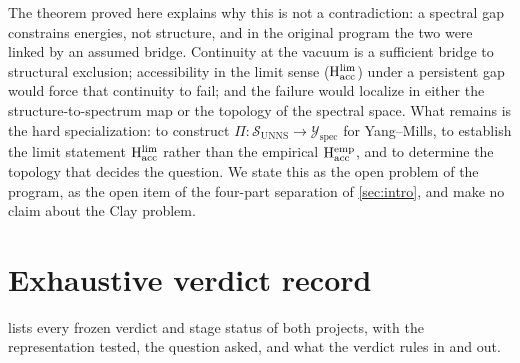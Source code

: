 \documentclass[11pt,a4paper]{article}
\theoremstyle{definition}
\theoremstyle{remark}
\newcommand{\SUNNS}{\mathcal{S}_{\mathrm{UNNS}}}
\newcommand{\Yspec}{\mathcal{Y}_{\mathrm{spec}}}
\newcommand{\Hacc}{\mathrm{H}_{\mathrm{acc}}}
\begin{document}
The theorem proved here explains why this is not a contradiction: a spectral gap constrains energies, not structure, and in the original program the two were linked by an assumed bridge. Continuity at the vacuum is a sufficient bridge to structural exclusion; accessibility in the limit sense ($\Hacc^{\rm lim}$) under a persistent gap would force that continuity to fail; and the failure would localize in either the structure-to-spectrum map or the topology of the spectral space. What remains is the hard specialization: to construct $\Pi:\SUNNS\to\Yspec$ for Yang--Mills, to establish the limit statement $\Hacc^{\rm lim}$ rather than the empirical $\Hacc^{\rm emp}$, and to determine the topology that decides the question. We state this as the open problem of the program, as the open item of the four-part separation of \cref{sec:intro}, and make no claim about the Clay problem.

\appendix
\section{Exhaustive verdict record}\label{app:record}
 lists every frozen verdict and stage status of both projects, with the representation tested, the question asked, and what the verdict rules in and out.
\end{document}
